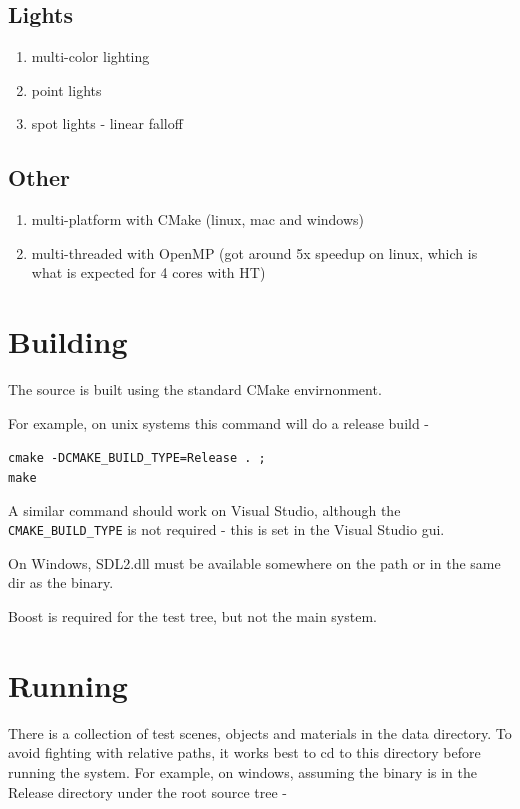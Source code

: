 \subsection{Lights}
    \begin{enumerate}
    \item multi-color lighting
    \item point lights
    \item spot lights - linear falloff
    \end{enumerate}

\subsection{Other}
    \begin{enumerate}
    \item multi-platform with CMake (linux, mac and windows)
    \item multi-threaded with OpenMP (got around 5x speedup on linux, which is what is expected for 4 cores with HT)
    \end{enumerate}

\section{Building}

The source is built using the standard CMake envirnonment.

For example, on unix systems this command will do a release build -

\verb|cmake -DCMAKE_BUILD_TYPE=Release . ;| \\
\verb|make|

A similar command should work on Visual Studio, although the \verb|CMAKE_BUILD_TYPE| is not required - this is set in the Visual Studio gui.

On Windows, SDL2.dll must be available somewhere on the path or in the same dir as the binary. 

Boost is required for the test tree, but not the main system.

\section{Running}

There is a collection of test scenes, objects and materials in the data directory. To avoid fighting with relative paths, it works best to cd to this directory before running the system. For example, on windows, assuming the binary is in the Release directory under the root source tree - 

